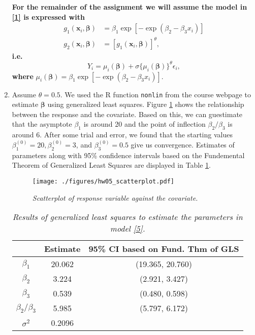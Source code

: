\documentclass[12pt]{article}
\begin{document}
\begin{enumerate}
    \vspace{2cm}

    \textbf{For the remainder of the assignment we will assume the model in \eqref{1} is expressed with }
    \begin{align}
      g_1(\bm{x}_i,\bm{\beta}) & = \beta_1\exp\left[ -\exp(\beta_2 - \beta_3x_i) \right] \nonumber \\
      g_2(\bm{x}_i, \bm{\beta}) & = [g_1(\bm{x}_i,\bm{\beta})]^{\theta},
      \label{4}
    \end{align}
    \textbf{i.e. }
    \begin{equation}
      Y_i = \mu_i(\bm{\beta}) + \sigma\{\mu_i(\bm{\beta})\}^{\theta}\epsilon_i,
      \label{5}
    \end{equation}
    \textbf{where }$\mu_i(\bm{\beta}) = \beta_1\exp\left[ -\exp(\beta_2 - \beta_3x_i) \right]$.

    \newpage

  \item Assume $\theta = 0.5$. We used the R function \texttt{nonlin} from the course webpage to estimate $\bm{\beta}$ using generalized least squares.
    Figure \ref{scatterplot} shows the relationship between the response and the covariate. Based on this, we can guestimate that the asymptote
    $\beta_1$ is around 20 and the point of inflection $\beta_2 / \beta_3$ is around 6. After some trial and error, we found that the starting values 
    $\beta_{1}^{(0)} = 20, \beta_{2}^{(0)} = 3$, and $\beta_{3}^{(0)} = 0.5$ give us convergence. Estimates of parameters along with 95\% 
    confidence intervals based on the Fundemental Theorem of Generalized Least Squares are displayed in Table \ref{tab2.1}.

    \begin{figure}[h]
      \caption{\emph{Scatterplot of response variable against the covariate.}}
      \centering
      \texttt{[image: ./figures/hw05\_scatterplot.pdf]}
      \label{scatterplot}
    \end{figure}


    \begin{table}[h]
      \caption{\emph{Results of generalized least squares to estimate the parameters in model \eqref{5}.}}
      \vspace{.2cm}
      \centering
      \begin{tabular}{|c|c|c|}
        \hline
        & Estimate & 95\% CI based on Fund. Thm of GLS \\
        \hline
        $\beta_1$ & 20.062 & (19.365, 20.760) \\
        \hline
        $\beta_2$ & 3.224 & (2.921, 3.427) \\
        \hline
        $\beta_3$ & 0.539 & (0.480, 0.598) \\
        \hline
        $\beta_2 / \beta_3$ & 5.985 & (5.797, 6.172) \\
        \hline
        $\sigma^{2}$ & 0.2096 & \\
        \hline
      \end{tabular}
      \label{tab2.1}
    \end{table}


\end{enumerate}
\end{document}
